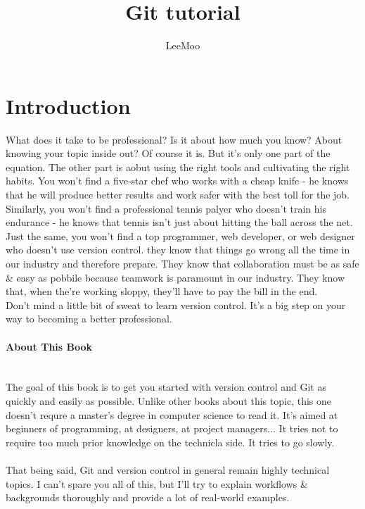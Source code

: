 \documentclass{book}
\title{\Large Git tutorial }
\author{LeeMoo}
\begin{document}
\maketitle
\tableofcontents

\section{Introduction}
	What does it take to be professional? Is it about how much you know? About knowing your topic inside out? Of course it is. But it's only one part of the equation. The other part is aobut using the right tools and cultivating the right habits. You won't find a five-star chef who works with a cheap knife - he knows that he will produce better results and work safer with the best toll for the job. Similarly, you won't find a professional tennis palyer who doesn't train his endurance - he knows that tennis isn't just about hitting the ball across the net.\\
	Just the same, you won't find a top programmer, web developer, or web designer who doesn't use version control. they know that things go wrong all the time in our industry and therefore prepare. They know that collaboration must be as safe & easy as pobbile because teamwork is paramount in our industry. They know that, when the're working sloppy, they'll have to pay the bill in the end.\\
	Don't mind a little bit of sweat to learn version control. It's a big step on your way to becoming a better professional.\\
\paragraph{About This Book}\\
The goal of this book is to get you started with version control and Git as quickly and easily as possible. Unlike other books about this topic, this one doesn't requre a master's degree in computer science to read it. It's aimed at beginners of programming, at designers, at project managers... It tries not to require too much prior knowledge on the technicla side. It tries to go slowly.\\
	   \paragraph{}
	   That being said, Git and version control in general remain highly technical topics. I can't spare you all of this, but I'll try to explain workflows & backgrounds thoroughly and provide a lot of real-world examples.\\
\end{document}
